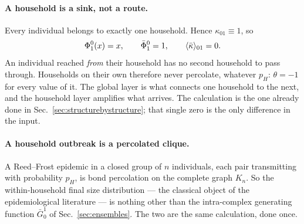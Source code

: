 \paragraph{A household is a sink, not a route.} Every individual belongs to
exactly one household. Hence $\kappa_{01}\equiv1$, so
\begin{equation}
  \Phi^{0}_{1}(x)=x,
  \qquad
  \bar\Phi^{0}_{1}=1,
  \qquad
  \langle \bar\kappa \rangle_{01}=0.
  \label{eq:sink}
\end{equation}
An individual reached \emph{from} their household has no second household to
pass through. Households on their own therefore never percolate, whatever
$p_{H}$: $\theta=-1$ for every value of it. The global layer is what connects
one household to the next, and the household layer amplifies what arrives. The
calculation is the one already done in Sec.~\ref{sec:structurebystructure};
that single zero is the only difference in the input.

\paragraph{A household outbreak is a percolated clique.} A Reed--Frost epidemic
in a closed group of $n$ individuals, each pair transmitting with probability
$p_{H}$, is bond percolation on the complete graph $K_{n}$. So the
within-household final size distribution --- the classical object of the
epidemiological literature \citep{ball1986} --- is nothing other than the
intra-complex generating function $\bar G^{1}_{0}$ of
Sec.~\ref{sec:ensembles}. The two are the same calculation, done once.

